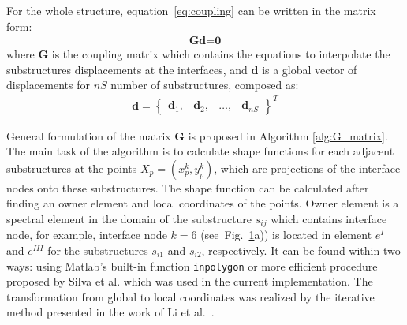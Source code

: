 \documentclass[materials,article,submit,moreauthors,pdftex]{Definitions/mdpi}
\begin{document}
{\begin{figure}
	\label{fig:interface}
\end{figure}
For the whole structure, equation~\ref{eq:coupling} can be written in the matrix form:
\begin{eqnarray}
\textbf{G}\textbf{d}=\textbf{0}
\label{eq:cond_disp}
\end{eqnarray}
where \textbf{G} is the coupling matrix which contains the equations to interpolate the substructures displacements at the interfaces, and \(\textbf{d}\) is a global vector of displacements for \(nS\) number of substructures, composed as:
\begin{eqnarray}
\textbf{d} = \left\{\begin{array}{cccc}
\textbf{d}_1, & \textbf{d}_2, &\ldots, & \textbf{d}_{nS}
\end{array}\right\}^T
\label{eq:displacements}
\end{eqnarray}

General formulation of the matrix \textbf{G} is proposed in Algorithm \ref{alg:G_matrix}.
The main task of the algorithm is to calculate shape functions for each adjacent substructures at the points \(X_p=(x_p^k,y_p^k)\), which are projections of the interface nodes onto these substructures.
The shape function can be calculated after finding an owner element and local coordinates of the points.
Owner element is a spectral element in the domain of the substructure \(s_{ij}\) which contains interface node, for example, interface node \(k=6\) (see~Fig.~\ref{fig:interface}a)) is located in element \(e^I\) and \(e^{III}\) for the substructures \(s_{i1}\) and \(s_{i2}\), respectively.
It can be found within two ways: using Matlab's built-in function \verb+inpolygon+ or more efficient procedure proposed by Silva et al. \cite{silva2009exact} which was used in the current implementation.
The transformation from global to local coordinates was realized by the iterative method presented in the work of Li et al.~\cite{li2014efficient}.

}
\end{document}
